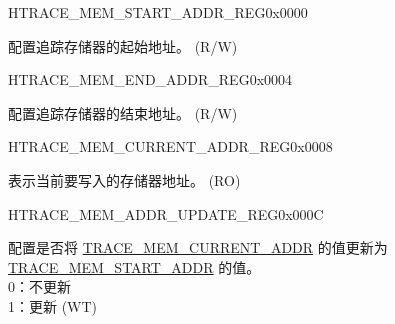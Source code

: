 \begin{register}{H}{TRACE\_MEM\_START\_ADDR\_REG}{0x0000}\label{regdesc:TRACEMEMSTARTADDRREG}
%
\regnewline%
\begin{regdesc}\begin{reglist}
\label{fielddesc:TRACEMEMSTARTADDR}\item [TRACE\_MEM\_START\_ADDR] 配置追踪存储器的起始地址。 (R/W)
\end{reglist}\end{regdesc}
\end{register}


\begin{register}{H}{TRACE\_MEM\_END\_ADDR\_REG}{0x0004}\label{regdesc:TRACEMEMENDADDRREG}
%
\regnewline%
\begin{regdesc}\begin{reglist}
\label{fielddesc:TRACEMEMENDADDR}\item [TRACE\_MEM\_END\_ADDR] 配置追踪存储器的结束地址。 (R/W)
\end{reglist}\end{regdesc}
\end{register}


\begin{register}{H}{TRACE\_MEM\_CURRENT\_ADDR\_REG}{0x0008}\label{regdesc:TRACEMEMCURRENTADDRREG}
%
\regnewline%
\begin{regdesc}\begin{reglist}
\label{fielddesc:TRACEMEMCURRENTADDR}\item [TRACE\_MEM\_CURRENT\_ADDR] 表示当前要写入的存储器地址。 (RO)
\end{reglist}\end{regdesc}
\end{register}


\begin{register}{H}{TRACE\_MEM\_ADDR\_UPDATE\_REG}{0x000C}\label{regdesc:TRACEMEMADDRUPDATEREG}
%
%
\regnewline%
\begin{regdesc}\begin{reglist}
\label{fielddesc:TRACEMEMCURRENTADDRUPDATE}\item [TRACE\_MEM\_CURRENT\_ADDR\_UPDATE] 配置是否将 \hyperref[fielddesc:TRACEMEMCURRENTADDR]{TRACE\_MEM\_CURRENT\_ADDR} 的值更新为 \hyperref[fielddesc:TRACEMEMSTARTADDR]{TRACE\_MEM\_START\_ADDR} 的值。\\0：不更新\\1：更新 (WT)
\end{reglist}\end{regdesc}
\end{register}


